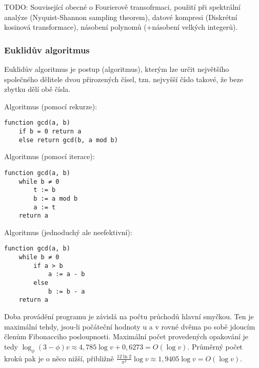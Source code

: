 TODO: Související obecné  o Fourierově transofrmaci, použití při spektrální analýze (Nyquist-Shannon sampling theorem), datové kompresi (Diskrétní kosinová transformace), násobení polynomů (+násobení velkých integerů).

\subsubsection*{Euklidův algoritmus}

Euklidův algoritmus je postup (algoritmus), kterým lze určit největšího společného dělitele dvou přirozených čísel, tzn. nejvyšší číslo takové, že beze zbytku dělí obě čísla.

Algoritmus (pomocí rekurze):
\begin{verbatim}
function gcd(a, b)
    if b = 0 return a
    else return gcd(b, a mod b)
\end{verbatim}

Algoritmus (pomocí iterace):
\begin{verbatim}
function gcd(a, b)
    while b ≠ 0
        t := b
        b := a mod b
        a := t
    return a
\end{verbatim}

Algoritmus (jednoduchý ale neefektivní):
\begin{verbatim}
function gcd(a, b)
    while b ≠ 0
        if a > b
            a := a - b
        else
            b := b - a
    return a
\end{verbatim}

Doba provádění programu je závislá na počtu průchodů hlavní smyčkou. Ten je maximální tehdy, jsou-li počáteční hodnoty u a v rovné dvěma po sobě jdoucím členům Fibonacciho posloupnosti. Maximální počet provedených opakování je tedy $\log_\phi (3-\phi)v \approx 4{,}785 \log v + 0{,}6273 = O(\log v)$. Průměrný počet kroků pak je o něco nižší, přibližně $\frac{12 \ln 2}{\pi^2}\log v \approx 1{,}9405 \log v = O(\log v)$.
